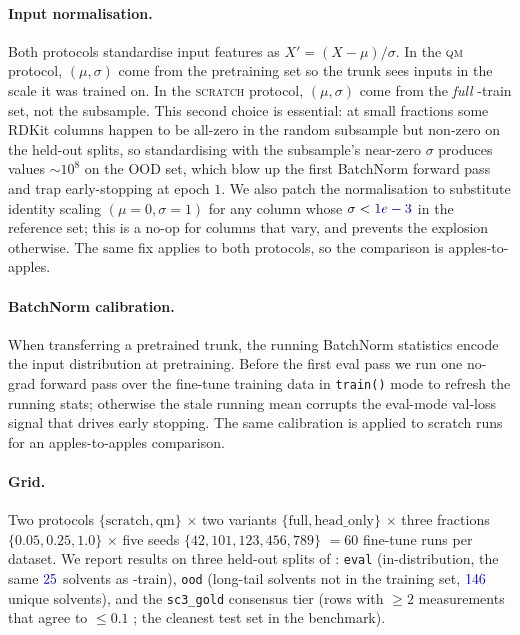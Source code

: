 \paragraph{Input normalisation.}  Both protocols standardise input
features as $X' = (X - \mu) / \sigma$.  In the \textsc{qm} protocol,
$(\mu, \sigma)$ come from the pretraining set so the trunk sees
inputs in the scale it was trained on.  In the \textsc{scratch}
protocol, $(\mu, \sigma)$ come from the \emph{full} \scthree{}-train
set, not the subsample.  This second choice is essential: at small
fractions some RDKit columns happen to be all-zero in the random
sub\-sample but non-zero on the held-out splits, so standardising
with the subsample's near-zero $\sigma$ produces values
$\sim \! 10^{8}$ on the OOD set, which blow up the first BatchNorm
forward pass and trap early-stopping at epoch $1$.  We also patch
the normalisation to substitute identity scaling
$(\mu \! = \! 0, \sigma \! = \! 1)$ for any column whose
$\sigma < \numval{1e-3}$ in the reference set; this is a no-op for
columns that vary, and prevents the explosion otherwise.  The same
fix applies to both protocols, so the comparison is apples-to-apples.

\paragraph{BatchNorm calibration.}  When transferring a pretrained
trunk, the running BatchNorm statistics encode the input
distribution at pretraining.  Before the first eval pass we run one
no-grad forward pass over the fine-tune training data in
\texttt{train()} mode to refresh the running stats; otherwise the
stale running mean corrupts the eval-mode val-loss signal that
drives early stopping.  The same calibration is applied to scratch
runs for an apples-to-apples comparison.

\paragraph{Grid.}  Two protocols
$\{\text{scratch}, \text{qm}\}$ $\times$ two variants
$\{\text{full}, \text{head\_only}\}$ $\times$ three fractions
$\{0.05, 0.25, 1.0\}$ $\times$ five seeds
$\{42, 101, 123, 456, 789\}$ $= 60$ fine-tune runs per dataset.  We
report results on three held-out splits of \scthree{}: \texttt{eval}
(in-distribution, the same $\numval{25}$ solvents as
\scthree{}-train), \texttt{ood} (long-tail solvents not in the
training set, $\numval{146}$ unique solvents), and the
\texttt{sc3\_gold} consensus tier (rows with $\geq 2$ measurements
that agree to $\le 0.1$ \logSunit{}; the cleanest test set in the
benchmark).

